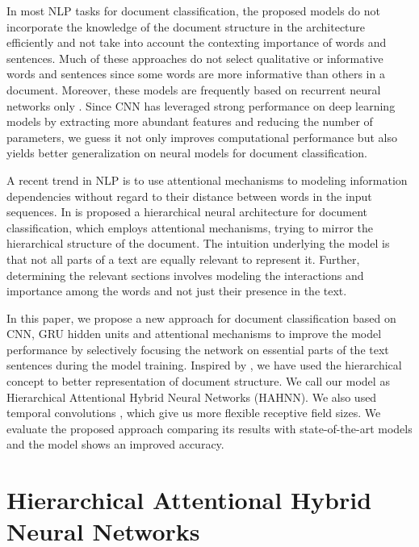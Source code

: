\documentclass[runningheads]{llncs}
\begin{document}
In most NLP tasks for document classification, the proposed models do not incorporate the knowledge of the document structure in the architecture efficiently and not take into account the contexting importance of words and sentences. Much of these approaches do not select qualitative or informative words and sentences since some words are more informative than others in a document. Moreover, these models are frequently based on recurrent neural networks only \cite{c1}. Since CNN has leveraged strong performance on deep learning models by extracting more abundant features and reducing the number of parameters, we guess it not only improves computational performance but also yields better generalization on neural models for document classification.

A recent trend in NLP is to use attentional mechanisms to modeling information dependencies without regard to their distance between words in the input sequences. In \cite{c1} is proposed a hierarchical neural architecture for document classification, which employs attentional mechanisms, trying to mirror the hierarchical structure of the document. The intuition underlying the model is that not all parts of a text are equally relevant to represent it. Further, determining the relevant sections involves modeling the interactions and importance among the words and not just their presence in the text.



In this paper, we propose a new approach for document classification based on CNN, GRU \cite{c12} hidden units and attentional mechanisms to improve the model performance by selectively focusing the network on essential parts of the text sentences during the model training. Inspired by \cite{c1}, we have used the hierarchical concept to better representation of document structure. We call our model as Hierarchical Attentional Hybrid Neural Networks (HAHNN). We also used temporal convolutions \cite{c6}, which give us more flexible receptive field sizes. We evaluate the proposed approach comparing its results with state-of-the-art models and the model shows an improved accuracy.\\[-8mm]



\section{Hierarchical Attentional Hybrid Neural Networks}
\end{document}

